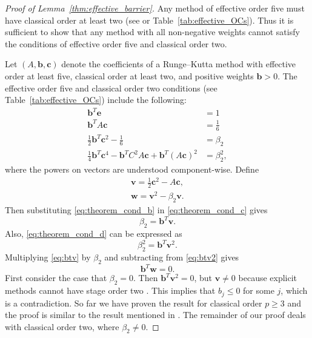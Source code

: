 \begin{proof}[Proof of Lemma~\ref{thm:effective_barrier}]
	Any method of effective order five must have classical order at least two
	(see \cite{Butcher2008_book} or Table~\ref{tab:effective_OCs}).
    Thus it is sufficient to show that any method with all non-negative weights
    cannot satisfy the conditions of effective order five and classical order two.

    Let $(A,\bm{b},\bm{c})$ denote the coefficients of a Runge--Kutta method with
    effective order at least five, classical order at least two, and positive 
    weights $\bm{b} > 0$.
    The effective order five and classical order two conditions
    (see Table~\ref{tab:effective_OCs}) include the following:
    \begin{subequations}\label{eq:theorem_cond}
    		\begin{align}
    			\bm{b}^T\bm{e} & = 1 \label{eq:theorem_cond_a} \\
             	\bm{b}^TA\bm{c} &= \frac{1}{6} \label{eq:theorem_cond_b} \\
            	\frac{1}{2}\bm{b}^T\bm{c}^2 - \frac{1}{6} &= \beta_2 \label{eq:theorem_cond_c} \\
            	\frac{1}{4}\bm{b}^T\bm{c}^4 - \bm{b}^TC^2A\bm{c} + \bm{b}^T(A\bm{c})^2 &= \beta_2^2, \label{eq:theorem_cond_d}
        	\end{align}
	\end{subequations}
	where the powers on vectors are understood component-wise. 
	Define
	\begin{align*} 
		\bm{v} = \frac{1}{2}\bm{c}^2 - A\bm{c}, \\
		\bm{w} = \bm{v}^{2} - \beta_{2}\bm{v}.
	\end{align*}
	Then substituting \eqref{eq:theorem_cond_b} in \eqref{eq:theorem_cond_c} gives
	\begin{equation}\label{eq:btv}
		\beta_2 = \bm{b}^T\bm{v}.
	\end{equation}
	Also, \eqref{eq:theorem_cond_d} can be expressed as
	\begin{equation}\label{eq:btv2}
		\beta_2^2 = \bm{b}^T\bm{v}^2.
	\end{equation}
        Multiplying \eqref{eq:btv} by $\beta_2$ and subtracting
        from \eqref{eq:btv2} gives
	\begin{equation}\label{eq:btw}
		\bm{b}^T\bm{w} = 0.
	\end{equation}
	First consider the case that $\beta_2 = 0$. 
	Then $\bm{b}^T\bm{v}^2 = 0$, but $\bm{v }\neq 0$ because explicit methods
	cannot have stage order two \cite{Ruuth2002}. This implies that $b_j \leq 0$ 
	for some $j$, which is a contradiction.
	So far we have proven the result for classical order $p \ge 3$ 
	and the proof is similar to the result mentioned in \cite{Ruuth2002}. 
	The remainder of our proof deals with classical order two, 
	where $\beta_2 \neq 0$.


\end{proof}
